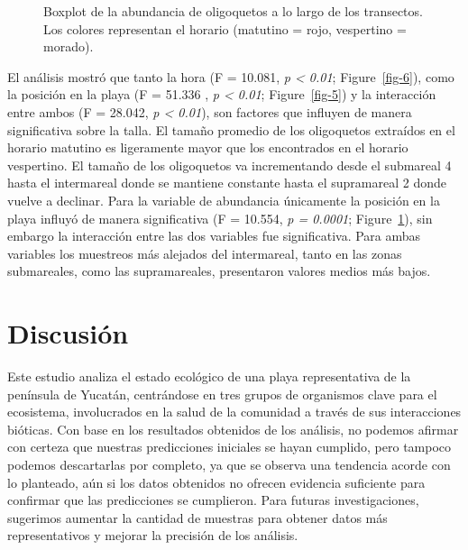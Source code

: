 \documentclass[
  authoryear,
  preprint,
  3p,
  twocolumn]{elsarticle}
\begin{document}
\begin{figure}


\caption{\label{fig-7}Boxplot de la abundancia de oligoquetos a lo largo
de los transectos. Los colores representan el horario (matutino = rojo,
vespertino = morado).}

\end{figure}%

El análisis mostró que tanto la hora (F = 10.081, \emph{p \textless{}
0.01}; Figure~\ref{fig-6}), como la posición en la playa (F = 51.336 ,
\emph{p \textless{} 0.01}; Figure~\ref{fig-5}) y la interacción entre
ambos (F = 28.042, \emph{p \textless{} 0.01}), son factores que influyen
de manera significativa sobre la talla. El tamaño promedio de los
oligoquetos extraídos en el horario matutino es ligeramente mayor que
los encontrados en el horario vespertino. El tamaño de los oligoquetos
va incrementando desde el submareal 4 hasta el intermareal donde se
mantiene constante hasta el supramareal 2 donde vuelve a declinar. Para
la variable de abundancia únicamente la posición en la playa influyó de
manera significativa (F = 10.554, \emph{p = 0.0001};
Figure~\ref{fig-7}), sin embargo la interacción entre las dos variables
fue significativa. Para ambas variables los muestreos más alejados del
intermareal, tanto en las zonas submareales, como las supramareales,
presentaron valores medios más bajos.

\section{Discusión}\label{discusiuxf3n}

Este estudio analiza el estado ecológico de una playa representativa de
la península de Yucatán, centrándose en tres grupos de organismos clave
para el ecosistema, involucrados en la salud de la comunidad a través de
sus interacciones bióticas. Con base en los resultados obtenidos de los
análisis, no podemos afirmar con certeza que nuestras predicciones
iniciales se hayan cumplido, pero tampoco podemos descartarlas por
completo, ya que se observa una tendencia acorde con lo planteado, aún
si los datos obtenidos no ofrecen evidencia suficiente para confirmar
que las predicciones se cumplieron. Para futuras investigaciones,
sugerimos aumentar la cantidad de muestras para obtener datos más
representativos y mejorar la precisión de los análisis.
\end{document}
